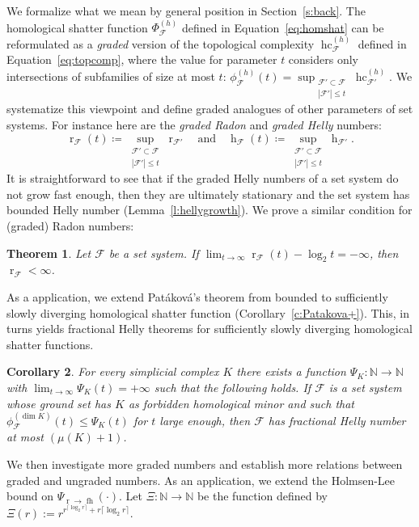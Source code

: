 \documentclass[11pt]{article}
\newcommand{\N}{\mathbb{N}}
\newcommand{\F}{\mathcal{F}}
\DeclareMathOperator{\h}{h}
\DeclareMathOperator{\rad}{r}
\DeclareMathOperator{\fh}{fh}
\DeclareMathOperator{\hc}{hc}
\newcommand{\defn}[1]{\emph{\color{violet}#1}}
\newtheorem{theorem}{Theorem}
\newtheorem{corollary}[theorem]{Corollary}
\begin{document}
%
\noindent
We formalize what we mean by general position in Section~\ref{s:back}.
%
\medskip
%
The homological shatter function $\Phi_\F^{(h)}$ defined in Equation~\eqref{eq:homshat} can be reformulated as a \emph{graded} version of the topological complexity $\hc^{(h)}_\F$ defined in Equation~\eqref{eq:topcomp}, where the value for parameter $t$ considers only intersections of subfamilies of size at most $t$: $\phi_\F^{(h)}(t)= \sup_{\substack{\F'\subset\F\\ |\F'| \le t} }\hc^{(h)}_{\F'}$. We systematize this viewpoint and define graded analogues of other parameters of set systems. For instance here are the \defn{graded Radon} and \defn{graded Helly} numbers:
%
\begin{equation}
  \rad_\F(t) \coloneqq \sup \limits_{\substack{\F'\subset \F \\ |\F'|\leq t}} \rad_{\F'}
 \quad \text{and} \quad
 \h_\F(t) \coloneqq \sup\limits_{\substack{\F'\subset \F \\ |\F'|\leq t}} \h_{\F'}.
\end{equation}
%
\noindent
It is straightforward to see that if the graded Helly numbers of a set system do not grow fast enough, then they are ultimately stationary and the set system has bounded Helly number (Lemma~\ref{l:hellygrowth}). We prove a similar condition for (graded) Radon numbers:
%
\begin{theorem}\label{t:radgrowth}
  Let $\F$ be a set system. If $\lim_{t \to \infty} \rad_\F(t) - \log_2 t = -\infty$, then $\rad_\F < \infty$.
\end{theorem}
%
\noindent
As a application, we extend Patáková's theorem from bounded to sufficiently slowly diverging homological shatter function (Corollary~\ref{c:Patakova+}). This, in turns yields fractional Helly theorems for sufficiently slowly diverging homological shatter functions.
%
\begin{corollary}\label{c:itgrows!}
  For every simplicial complex $K$ there exists a function $\Psi_K : \N \to \N$ with $\lim_{t \to \infty} \Psi_K(t) = +\infty$ such that the following holds. If $\F$ is a set system whose ground set has $K$ as forbidden homological minor and such that $\phi_{\F}^{(\dim K)}(t) \le \Psi_K(t)$ for $t$ large enough, then $\F$ has fractional Helly number at most $(\mu(K)+1)$.
\end{corollary}
%
\medskip
%
We then investigate more graded numbers and establish more relations between graded and ungraded numbers. As an application, we extend the Holmsen-Lee bound on $\Psi_{\rad \to \fh}(\cdot)$. Let $\Xi: \N \to \N$ be the function defined by $\Xi(r) := r^{r^{\lceil \log_2r \rceil}+r\lceil \log_2r \rceil}$. 
\end{document}

